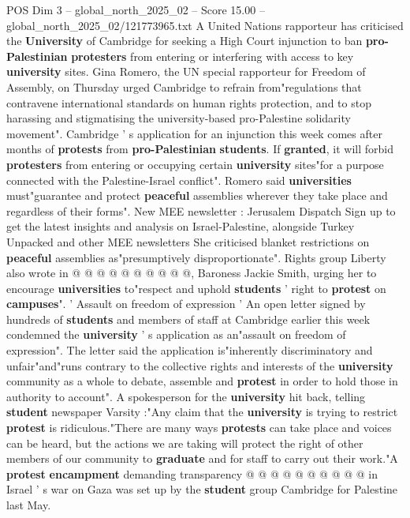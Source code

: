 \begin{textsample}{POS Dim 3 – global\_north\_2025\_02 – Score 15.00 – global\_north\_2025\_02/121773965.txt}  \label{ex:f3_pos_296}
A United Nations rapporteur has criticised the \textbf{University} of Cambridge for seeking a High Court injunction to ban \textbf{pro-Palestinian} \textbf{protesters} from entering or interfering with access to key \textbf{university} sites.
Gina Romero, the UN special rapporteur for Freedom of Assembly, on Thursday urged Cambridge to refrain from"regulations that contravene international standards on human rights protection, and to stop harassing and stigmatising the university-based pro-Palestine solidarity movement".
Cambridge ' s application for an injunction this week comes after months of \textbf{protests} from \textbf{pro-Palestinian} \textbf{students}.
If \textbf{granted}, it will forbid \textbf{protesters} from entering or occupying certain \textbf{university} sites"for a purpose connected with the Palestine-Israel conflict".
Romero said \textbf{universities} must"guarantee and protect \textbf{peaceful} assemblies wherever they take place and regardless of their forms".
New MEE newsletter : Jerusalem Dispatch Sign up to get the latest insights and analysis on Israel-Palestine, alongside Turkey Unpacked and other MEE newsletters She criticised blanket restrictions on \textbf{peaceful} assemblies as"presumptively disproportionate".
Rights group Liberty also wrote in @ @ @ @ @ @ @ @ @ @, Baroness Jackie Smith, urging her to encourage \textbf{universities} to"respect and uphold \textbf{students} ' right to \textbf{protest} on \textbf{campuses}". ' Assault on freedom of expression ' An open letter signed by hundreds of \textbf{students} and members of staff at Cambridge earlier this week condemned the \textbf{university} ' s application as an"assault on freedom of expression".
The letter said the application is"inherently discriminatory and unfair"and"runs contrary to the collective rights and interests of the \textbf{university} community as a whole to debate, assemble and \textbf{protest} in order to hold those in authority to account".
A spokesperson for the \textbf{university} hit back, telling \textbf{student} newspaper Varsity :"Any claim that the \textbf{university} is trying to restrict \textbf{protest} is ridiculous."There are many ways \textbf{protests} can take place and voices can be heard, but the actions we are taking will protect the right of other members of our community to \textbf{graduate} and for staff to carry out their work."A \textbf{protest} \textbf{encampment} demanding transparency @ @ @ @ @ @ @ @ @ @ in Israel ' s war on Gaza was set up by the \textbf{student} group Cambridge for Palestine last May.

\end{textsample}

